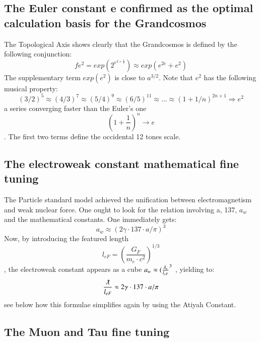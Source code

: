 \documentclass[twoside,draft]{article}
\begin{document}
\begin{sloppypar}
{\subsection {The Euler constant e confirmed as the optimal calculation basis for the Grandcosmos}

The Topological Axis shows clearly that the Grandcosmos is defined by the following
conjunction:
\begin{equation}
f{e^{2}} = exp(2^{e^{2+\frac{1}{2}}}) \approx exp(e^{2e}+e^{2})
\end{equation}
The supplementary term $exp(e^{2})$ is close to $a^{3/2}$. Note that $e^{2}$ has the following musical property:
\begin{equation}
(3/2)^{5} \approx (4/3)^{7} \approx (5/4)^{9} \approx (6/5)^{11} \approx ... \approx (1+1/n)^{2n+1} \Rightarrow e^{2}
\end{equation}
a series converging faster than the Euler's one $$(1+\frac{1}{n})^{n} \rightarrow e$$. The first two terms define
the occidental 12 tones scale.

\subsection {The electroweak constant mathematical fine tuning}

The Particle standard model achieved the unification between electromagnetism and weak
nuclear force. One ought to look for the relation involving a, 137, $a_{w}$ and the mathematical constants. One
immediately gets:
\begin{equation}
a_{w} \approx (2\gamma \cdot 137 \cdot a/\pi)^{3}
\end{equation}
Now, by introducing the featured length $$l_{eF} = (\frac{G_{F}}{m_{e} \cdot c^{2}})^{1/3}$$ , the electroweak constant appears as
a cube $a_{w} \approx (\frac{\lambdabar_{e}}{l_{eF}}^{3}$ , yielding to:
\begin{equation}
\frac{\lambdabar}{l_{eF}} \approx 2\gamma \cdot 137 \cdot a/\pi
\end{equation}
see below how this formulae simplifies again by using the Atiyah Constant.

\subsection {The Muon and Tau fine tuning}

}
\end{sloppypar}
\end{document}
